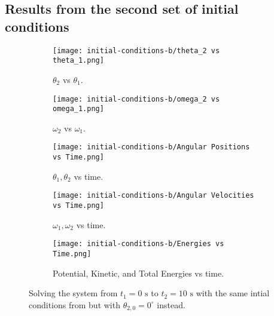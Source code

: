 \subsection{Results from the second set of initial conditions}\label{subsec:results-from-the-second-set-of-initial-conditions}
\begin{figure}[H]
    \centering
    \begin{subfigure}[b]{0.49\textwidth}
        \centering
        \texttt{[image: initial-conditions-b/theta\_2 vs theta\_1.png]}
        \caption{$\theta_2$ vs $\theta_1$.}
        \label{fig:3a}
    \end{subfigure}
    \hfill
    \begin{subfigure}[b]{0.49\textwidth}
        \centering
        \texttt{[image: initial-conditions-b/omega\_2 vs omega\_1.png]}
        \caption{$\omega_2$ vs $\omega_1$.}
        \label{fig:3b}
    \end{subfigure}
    \hfill
    \begin{subfigure}[b]{0.49\textwidth}
        \centering
        \texttt{[image: initial-conditions-b/Angular Positions vs Time.png]}
        \caption{$\theta_1, \theta_2$ vs time.}
        \label{fig:3c}
    \end{subfigure}
    \hfill
    \begin{subfigure}[b]{0.49\textwidth}
        \centering
        \texttt{[image: initial-conditions-b/Angular Velocities vs Time.png]}
        \caption{$\omega_1, \omega_2$ vs time.}
        \label{fig:3d}
    \end{subfigure}
    \hfill
    \begin{subfigure}[b]{0.49\textwidth}
        \centering
        \texttt{[image: initial-conditions-b/Energies vs Time.png]}
        \caption{Potential, Kinetic, and Total Energies vs time.}
        \label{fig:3e}
    \end{subfigure}
    \caption{Solving the system from $t_1 = 0\text{ s}$ to $t_2 = 10\text{ s}$ with the same intial conditions from  but with $\theta_{2,0} = 0^\circ$ instead.}
    \label{fig:3}
\end{figure}
